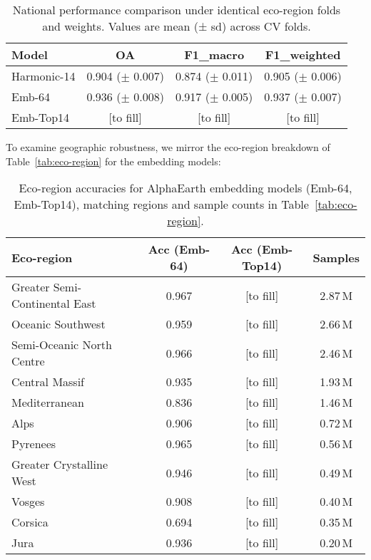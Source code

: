 \documentclass[utf8]{FrontiersinHarvard}
\begin{document}
\begin{table}[H]
    \centering
    \begin{tabular}{lccc}
        \hline
        \textbf{Model} & \textbf{OA} & \textbf{F1\_macro} & \textbf{F1\_weighted} \\ \hline
        Harmonic-14 & 0.904 (\(\pm\) 0.007) & 0.874 (\(\pm\) 0.011) & 0.905 (\(\pm\) 0.006) \\
        Emb-64 & 0.936 (\(\pm\) 0.008) & 0.917 (\(\pm\) 0.005) & 0.937 (\(\pm\) 0.007) \\
        Emb-Top14 & [to fill] & [to fill] & [to fill] \\ \hline
    \end{tabular}
    \caption{National performance comparison under identical eco-region folds and weights. Values are mean (± sd) across CV folds.}
    \label{tab:national_ablation}
\end{table}

To examine geographic robustness, we mirror the eco-region breakdown of Table~\ref{tab:eco-region} for the embedding models:

\begin{table}[H]
\centering
\begin{tabular}{lccc}
\hline
\textbf{Eco-region} & \textbf{Acc (Emb-64)} & \textbf{Acc (Emb-Top14)} & \textbf{Samples} \\ \hline
Greater Semi-Continental East & 0.967 & [to fill] & 2.87\,M \\
Oceanic Southwest & 0.959 & [to fill] & 2.66\,M \\
Semi-Oceanic North Centre & 0.966 & [to fill] & 2.46\,M \\
Central Massif & 0.935 & [to fill] & 1.93\,M \\
Mediterranean & 0.836 & [to fill] & 1.46\,M \\
Alps & 0.906 & [to fill] & 0.72\,M \\
Pyrenees & 0.965 & [to fill] & 0.56\,M \\
Greater Crystalline West & 0.946 & [to fill] & 0.49\,M \\
Vosges & 0.908 & [to fill] & 0.40\,M \\
Corsica & 0.694 & [to fill] & 0.35\,M \\
Jura & 0.936 & [to fill] & 0.20\,M \\ \hline
\end{tabular}
\caption{Eco-region accuracies for AlphaEarth embedding models (Emb-64, Emb-Top14), matching regions and sample counts in Table~\ref{tab:eco-region}.}
\label{tab:eco-region-emb}
\end{table}
\end{document}

